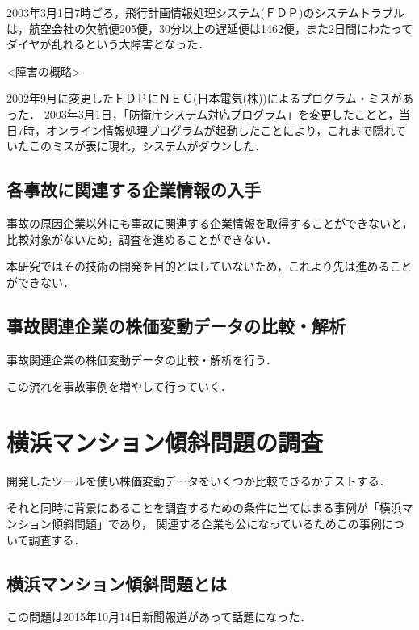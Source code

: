 {\begin{itemize}
2003年3月1日7時ごろ，飛行計画情報処理システム(ＦＤＰ)のシステムトラブルは，航空会社の欠航便205便，30分以上の遅延便は1462便，また2日間にわたってダイヤが乱れるという大障害となった．

<障害の概略>
 
2002年9月に変更したＦＤＰにＮＥＣ(日本電気(株))によるプログラム・ミスがあった．
2003年3月1日，「防衛庁システム対応プログラム」を変更したことと，当日7時，オンライン情報処理プログラムが起動したことにより，これまで隠れていたこのミスが表に現れ，システムがダウンした\cite{kouku}．

\end{itemize}

\subsection{各事故に関連する企業情報の入手}

事故の原因企業以外にも事故に関連する企業情報を取得することができないと，
比較対象がないため，調査を進めることができない．

本研究ではその技術の開発を目的とはしていないため，これより先は進めることができない．



\subsection{事故関連企業の株価変動データの比較・解析}
事故関連企業の株価変動データの比較・解析を行う．

この流れを事故事例を増やして行っていく．










\section{横浜マンション傾斜問題の調査}
開発したツールを使い株価変動データをいくつか比較できるかテストする．

それと同時に背景にあることを調査するための条件に当てはまる事例が「横浜マンション傾斜問題」であり，
関連する企業も公になっているためこの事例について調査する．



\subsection{横浜マンション傾斜問題とは}
この問題は2015年10月14日新聞報道があって話題になった．

}
